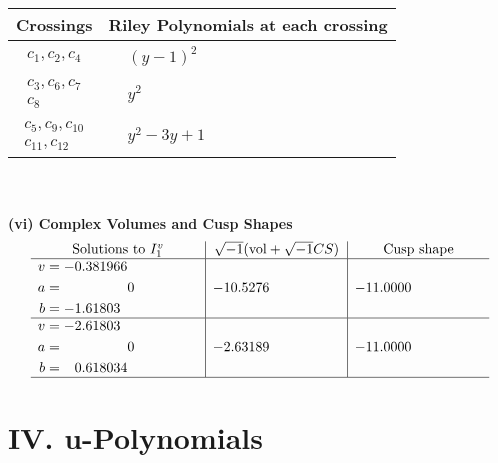 \documentclass[1p]{elsarticle_modified}
\theoremstyle{definition}
\newcommand{\I}{\sqrt{-1}}
\begin{document}
\begin{tabular}{m{50pt}|m{274pt}}
Crossings & \hspace{64pt}Riley Polynomials at each crossing \\
\hline $$\begin{aligned}c_{1},c_{2},c_{4}\end{aligned}$$&$\begin{aligned}
&(y-1)^2
\end{aligned}$\\
\hline $$\begin{aligned}c_{3},c_{6},c_{7}\\c_{8}\end{aligned}$$&$\begin{aligned}
&y^2
\end{aligned}$\\
\hline $$\begin{aligned}c_{5},c_{9},c_{10}\\c_{11},c_{12}\end{aligned}$$&$\begin{aligned}
&y^2-3 y+1
\end{aligned}$\\
\hline
\end{tabular}\\~\\
\newpage\flushleft \textbf{(vi) Complex Volumes and Cusp Shapes}
$$\begin{array}{c|c|c}  
\text{Solutions to }I^v_{1}& \I (\text{vol} + \sqrt{-1}CS) & \text{Cusp shape}\\
 \hline 
\begin{aligned}
v &= -0.381966\phantom{ +0.000000I} \\
a &= \phantom{-0.000000 } 0 \\
b &= -1.61803\phantom{ +0.000000I}\end{aligned}
 & -10.5276\phantom{ +0.000000I} & -11.0000\phantom{ +0.000000I} \\ \hline\begin{aligned}
v &= -2.61803\phantom{ +0.000000I} \\
a &= \phantom{-0.000000 } 0 \\
b &= \phantom{-}0.618034\phantom{ +0.000000I}\end{aligned}
 & -2.63189\phantom{ +0.000000I} & -11.0000\phantom{ +0.000000I}\\
 \hline 
 \end{array}$$\newpage
\newpage\renewcommand{\arraystretch}{1}
\centering \section*{ IV. u-Polynomials}
\end{document}
